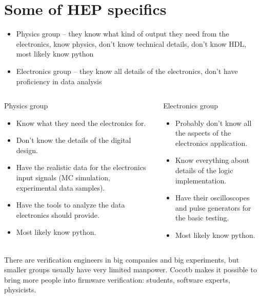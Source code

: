 \documentclass[aspectratio=169]{beamer}
\begin{document}
\section*{Some of HEP specifics}
\begin{frame}{\secname}
  \begin{itemize}
    \item Physics group -- they know what kind of output they need from the electronics, know physics, 
      don't know technical details, don't know HDL, most likely know python
    \item Electronics group -- they know all details of the electronics, don't have proficiency in data analysis
  \end{itemize}
   \begin{columns}
     \begin{column}{0.5\textwidth}
       \begin{block}{Physics group}
           \begin{itemize}
           \item Know what they need the electronics for.
           \item Don't know the details of the digital design. 
           \item Have the realistic data for the electronics input signals 
             (MC simulation, experimental data samples).
           \item Have the tools to analyze the data electronics should provide.
           \item Most likely know python.
           \end{itemize}
         
       \end{block}
     \end{column}
     \begin{column}{0.5\textwidth}
       \begin{block}{Electronics group}
         \begin{itemize}
           \item Probably don't know all the aspects of the electronics application. 
           \item Know everything about details of the logic implementation. 
           \item Have their oscilloscopes and pulse generators for the basic testing. 
           \item Most likely know python. 
         \end{itemize}
         
       \end{block}
       
     \end{column}
   \end{columns}
    
   There are  verification engineers in big companies and big experiments, but smaller groups usually have very limited manpower. Cocotb makes it possible to bring more people into firmware verification: students, software experts, physicists. 

\end{frame}
\end{document}
